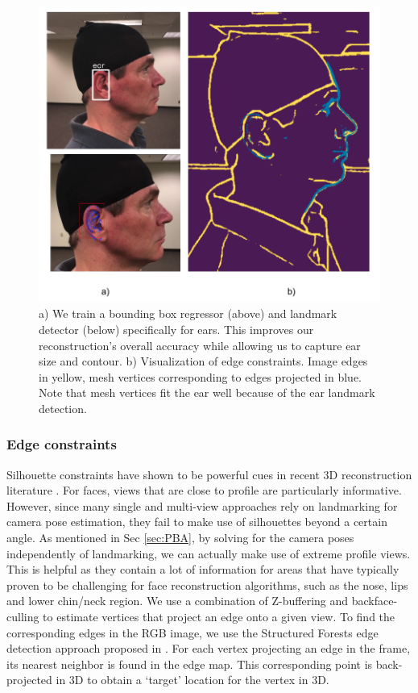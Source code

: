 \documentclass[10pt,twocolumn,letterpaper]{article}
\begin{document}
\begin{figure}[t]
\begin{center}
   \includegraphics[width=0.7\linewidth]{images/ear_lm_and_edges.png}
\end{center}
   \caption{ a) We train a bounding box regressor (above) and landmark detector (below) specifically for ears. This improves our reconstruction's overall accuracy while allowing us to capture ear size and contour. b) Visualization of edge constraints. Image edges in yellow, mesh vertices corresponding to edges projected in blue. Note that mesh vertices fit the ear well because of the ear landmark detection. }
\label{fig:ear_lm_and_edges}
\end{figure}





\subsubsection{Edge constraints}
Silhouette constraints have shown to be powerful cues in recent 3D reconstruction literature \cite{alldieck2018detailed,bas2016fitting}. For faces, views that are close to profile are particularly informative. However, since many single and multi-view approaches rely on landmarking for camera pose estimation, they fail to make use of silhouettes beyond a certain angle.
As mentioned in Sec \ref{sec:PBA}, by solving for the camera poses independently of landmarking, we can actually make use of extreme profile views. This is helpful as they contain a lot of information for areas that have typically proven to be challenging for face reconstruction algorithms, such as the nose, lips and lower chin/neck region.
We use a combination of Z-buffering \cite{Foley1990ComputerG} and backface-culling  to estimate vertices that project an edge onto a given view. To find the corresponding edges in the RGB image, we use the Structured Forests edge detection approach proposed in \cite{dollar2013structured}. For each vertex projecting an edge in the frame, its nearest neighbor is found in the edge map. This corresponding point is back-projected in 3D to obtain a `target' location for the vertex in 3D.
\end{document}
